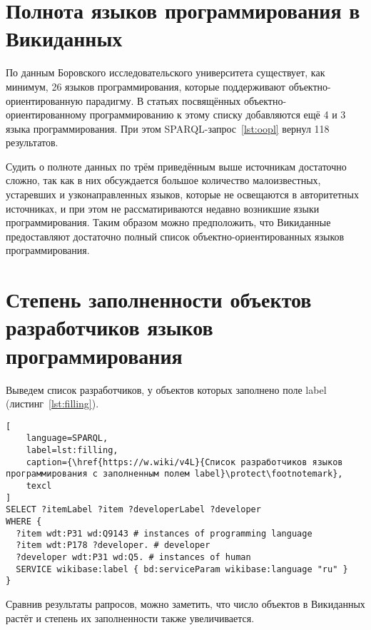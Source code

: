 \section{Полнота языков программирования в Викиданных}
По данным Боровского исследовательского университета\cite{oo_langs_bourabai} существует, как минимум, 26 языков программирования, которые поддерживают объектно-ориентированную парадигму. В статьях посвящённых объектно-ориентированному программированию к этому списку добавляются ещё 4\cite{oo_langs_science_wikia} и 3\cite{oo_langs_garshin} языка программирования. При этом SPARQL-запрос~\ref{lst:oopl} вернул 118 результатов.

Судить о полноте данных по трём приведённым выше источникам достаточно сложно, так как в них обсуждается большое количество малоизвестных, устаревших и узконаправленных языков, которые не освещаются в авторитетных источниках, и при этом не рассматириваются недавно возникшие языки программирования. Таким образом можно предположить, что Викиданные предоставляют достаточно полный список объектно-ориентированных языков программирования.

\section{Степень заполненности объектов разработчиков языков программирования}
Выведем список разработчиков, у объектов которых заполнено поле label (листинг~\ref{lst:filling}).

\begin{lstlisting}[
	language=SPARQL,
	label=lst:filling,
	caption={\href{https://w.wiki/v4L}{Список разработчиков языков программирования с заполненным полем label}\protect\footnotemark},
	texcl
]
SELECT ?itemLabel ?item ?developerLabel ?developer
WHERE {
  ?item wdt:P31 wd:Q9143 # instances of programming language
  ?item wdt:P178 ?developer. # developer 
  ?developer wdt:P31 wd:Q5. # instances of human
  SERVICE wikibase:label { bd:serviceParam wikibase:language "ru" }
}
\end{lstlisting}
Сравнив результаты рапросов, можно заметить, что число объектов в Викиданных растёт и степень их заполненности также увеличивается.


